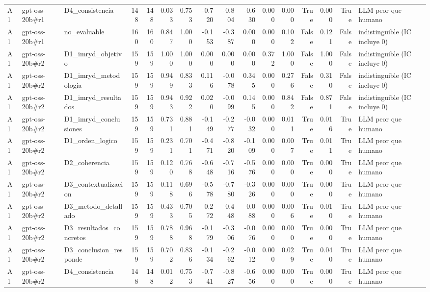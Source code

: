 \begin{table}
{\begin{tabular}{lllrrrrrrrrrrrrl}
A1 & gpt-oss-20b\#r1 & D4\_consistencia & 148 & 148 & 0.033 & 0.753 & -0.720 & -0.804 & -0.630 & 0.000 & 0.000 & True & 0.000 & True & LLM peor que humano \\
A1 & gpt-oss-20b\#r1 & no\_evaluable & 160 & 160 & 0.847 & 1.000 & -0.153 & -0.387 & 0.000 & 0.000 & 0.102 & False & 0.121 & False & indistinguible (IC incluye 0) \\
A1 & gpt-oss-20b\#r2 & D1\_imryd\_objetivo & 159 & 159 & 1.000 & 1.000 & 0.000 & 0.000 & 0.000 & 0.372 & 1.000 & False & 1.000 & False & indistinguible (IC incluye 0) \\
A1 & gpt-oss-20b\#r2 & D1\_imryd\_metodologia & 159 & 159 & 0.949 & 0.833 & 0.116 & -0.078 & 0.345 & 0.000 & 0.276 & False & 0.310 & False & indistinguible (IC incluye 0) \\
A1 & gpt-oss-20b\#r2 & D1\_imryd\_resultados & 159 & 159 & 0.943 & 0.922 & 0.020 & -0.099 & 0.145 & 0.000 & 0.842 & False & 0.871 & False & indistinguible (IC incluye 0) \\
A1 & gpt-oss-20b\#r2 & D1\_imryd\_conclusiones & 159 & 159 & 0.731 & 0.881 & -0.149 & -0.277 & -0.032 & 0.000 & 0.011 & True & 0.016 & True & LLM peor que humano \\
A1 & gpt-oss-20b\#r2 & D1\_orden\_logico & 159 & 159 & 0.231 & 0.701 & -0.471 & -0.820 & -0.109 & 0.000 & 0.007 & True & 0.011 & True & LLM peor que humano \\
A1 & gpt-oss-20b\#r2 & D2\_coherencia & 159 & 159 & 0.120 & 0.768 & -0.648 & -0.716 & -0.576 & 0.000 & 0.000 & True & 0.000 & True & LLM peor que humano \\
A1 & gpt-oss-20b\#r2 & D3\_contextualizacion & 159 & 159 & 0.118 & 0.696 & -0.578 & -0.780 & -0.326 & 0.000 & 0.000 & True & 0.000 & True & LLM peor que humano \\
A1 & gpt-oss-20b\#r2 & D3\_metodo\_detallado & 159 & 159 & 0.433 & 0.705 & -0.272 & -0.448 & -0.088 & 0.000 & 0.006 & True & 0.010 & True & LLM peor que humano \\
A1 & gpt-oss-20b\#r2 & D3\_resultados\_concretos & 159 & 159 & 0.788 & 0.968 & -0.179 & -0.306 & -0.076 & 0.000 & 0.000 & True & 0.000 & True & LLM peor que humano \\
A1 & gpt-oss-20b\#r2 & D3\_conclusion\_responde & 159 & 159 & 0.702 & 0.836 & -0.134 & -0.262 & -0.012 & 0.000 & 0.029 & True & 0.040 & True & LLM peor que humano \\
A1 & gpt-oss-20b\#r2 & D4\_consistencia & 148 & 148 & 0.012 & 0.753 & -0.741 & -0.827 & -0.656 & 0.000 & 0.000 & True & 0.000 & True & LLM peor que humano \\

\end{tabular}}
\end{table}

